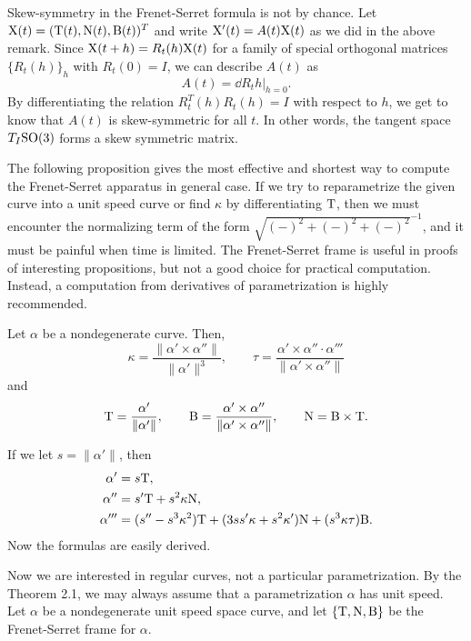 \documentclass{../../large}
\def\a{\alpha}
\begin{document}
\begin{rmk}
Skew-symmetry in the Frenet-Serret formula is not by chance.
Let $\mathrm{X}(t)=(\mathrm{T}(t),\mathrm{N}(t),\mathrm{B}(t))^T$ and write $\mathrm{X}'(t)=A(t)\mathrm{X}(t)$ as we did in the above remark.
Since $\mathrm{X}(t+h)=R_t(h)\mathrm{X}(t)$ for a family of special orthogonal matrices $\{R_t(h)\}_h$ with $R_t(0)=I$, we can describe $A(t)$ as 
\[A(t)=\left.\dd{R_t}{h}\right\rvert_{h=0}.\]
By differentiating the relation $R_t^T(h)R_t(h)=I$ with respect to $h$, we get to know that $A(t)$ is skew-symmetric for all $t$.
In other words, the tangent space $T_I\mathrm{SO}(3)$ forms a skew symmetric matrix.
\end{rmk}



The following proposition gives the most effective and shortest way to compute the Frenet-Serret apparatus in general case.
If we try to reparametrize the given curve into a unit speed curve or find $\kappa$ by differentiating $\mathrm{T}$, then we must encounter the normalizing term of the form $\sqrt{(-)^2+(-)^2+(-)^2}^{-1}$, and it must be painful when time is limited.
The Frenet-Serret frame is useful in proofs of interesting propositions, but not a good choice for practical computation.
Instead, a computation from derivatives of parametrization is highly recommended.
\begin{prop}
Let $\a$ be a nondegenerate curve.
Then,
\[\kappa=\frac{\|\a'\times\a''\|}{\|\a'\|^3},\qquad\tau=\frac{\a'\times\a''\cdot\a'''}{\|\a'\times\a''\|}\]
and
\[\rT=\frac{\a'}{\|\a'\|},\qquad\rB=\frac{\a'\times\a''}{\|\a'\times\a''\|},\qquad\rN=\rB\times\rT.\]
\end{prop}
\begin{pf}
If we let $s=\|\a'\|$, then
\begin{align*}
\a'&=s\rT,\\
\a''&=s'\rT+s^2\kappa\rN,\\
\a'''&=(s''-s^3\kappa^2)\rT+(3ss'\kappa+s^2\kappa')\rN+(s^3\kappa\tau)\rB.
\end{align*}
Now the formulas are easily derived.
\end{pf}



Now we are interested in regular curves, not a particular parametrization.
By the Theorem 2.1, we may always assume that a parametrization $\a$ has unit speed.
Let $\a$ be a nondegenerate unit speed space curve, and let $\{\mathrm{T},\mathrm{N},\mathrm{B}\}$ be the Frenet-Serret frame for $\a$.
\end{document}
